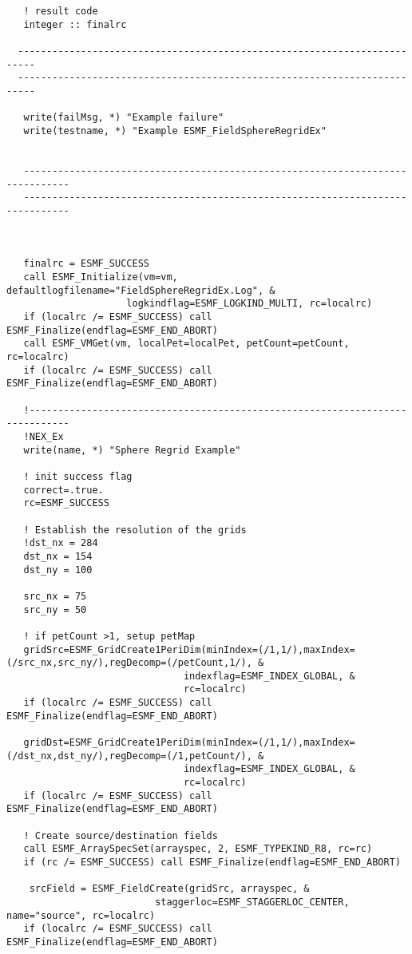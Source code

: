 \begin{verbatim}
   ! result code
   integer :: finalrc
 
  -------------------------------------------------------------------------
  -------------------------------------------------------------------------
 
   write(failMsg, *) "Example failure"
   write(testname, *) "Example ESMF_FieldSphereRegridEx"
 
 
   ------------------------------------------------------------------------------
   ------------------------------------------------------------------------------
 
 
   
   finalrc = ESMF_SUCCESS
   call ESMF_Initialize(vm=vm, defaultlogfilename="FieldSphereRegridEx.Log", &
                     logkindflag=ESMF_LOGKIND_MULTI, rc=localrc)
   if (localrc /= ESMF_SUCCESS) call ESMF_Finalize(endflag=ESMF_END_ABORT)
   call ESMF_VMGet(vm, localPet=localPet, petCount=petCount, rc=localrc)
   if (localrc /= ESMF_SUCCESS) call ESMF_Finalize(endflag=ESMF_END_ABORT)
 
   !-----------------------------------------------------------------------------
   !NEX_Ex
   write(name, *) "Sphere Regrid Example"
 
   ! init success flag
   correct=.true.
   rc=ESMF_SUCCESS
 
   ! Establish the resolution of the grids
   !dst_nx = 284
   dst_nx = 154
   dst_ny = 100
 
   src_nx = 75
   src_ny = 50
 
   ! if petCount >1, setup petMap
   gridSrc=ESMF_GridCreate1PeriDim(minIndex=(/1,1/),maxIndex=(/src_nx,src_ny/),regDecomp=(/petCount,1/), &
                               indexflag=ESMF_INDEX_GLOBAL, &
                               rc=localrc)
   if (localrc /= ESMF_SUCCESS) call ESMF_Finalize(endflag=ESMF_END_ABORT)
 
   gridDst=ESMF_GridCreate1PeriDim(minIndex=(/1,1/),maxIndex=(/dst_nx,dst_ny/),regDecomp=(/1,petCount/), &
                               indexflag=ESMF_INDEX_GLOBAL, &
                               rc=localrc)
   if (localrc /= ESMF_SUCCESS) call ESMF_Finalize(endflag=ESMF_END_ABORT)
 
   ! Create source/destination fields
   call ESMF_ArraySpecSet(arrayspec, 2, ESMF_TYPEKIND_R8, rc=rc)
   if (rc /= ESMF_SUCCESS) call ESMF_Finalize(endflag=ESMF_END_ABORT)
 
    srcField = ESMF_FieldCreate(gridSrc, arrayspec, &
                          staggerloc=ESMF_STAGGERLOC_CENTER, name="source", rc=localrc)
   if (localrc /= ESMF_SUCCESS) call ESMF_Finalize(endflag=ESMF_END_ABORT)
 

\end{verbatim}
